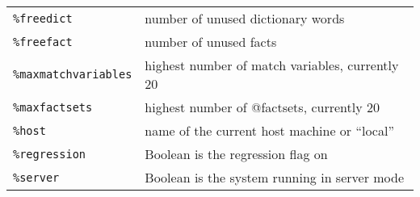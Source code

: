 \documentclass[]{article}
\begin{document}
\begin{longtable}[]{@{}ll@{}}
\begin{minipage}[t]{0.12\columnwidth}
\texttt{\%freedict}\strut
\end{minipage} & \begin{minipage}[t]{0.10\columnwidth}\raggedright\strut
number of unused dictionary words\strut
\end{minipage}\tabularnewline
\begin{minipage}[t]{0.12\columnwidth}\raggedright\strut
\texttt{\%freefact}\strut
\end{minipage} & \begin{minipage}[t]{0.10\columnwidth}\raggedright\strut
number of unused facts\strut
\end{minipage}\tabularnewline
\begin{minipage}[t]{0.12\columnwidth}\raggedright\strut
\texttt{\%maxmatchvariables}\strut
\end{minipage} & \begin{minipage}[t]{0.10\columnwidth}\raggedright\strut
highest number of match variables, currently 20\strut
\end{minipage}\tabularnewline
\begin{minipage}[t]{0.12\columnwidth}\raggedright\strut
\texttt{\%maxfactsets}\strut
\end{minipage} & \begin{minipage}[t]{0.10\columnwidth}\raggedright\strut
highest number of @factsets, currently 20\strut
\end{minipage}\tabularnewline
\begin{minipage}[t]{0.12\columnwidth}\raggedright\strut
\texttt{\%host}\strut
\end{minipage} & \begin{minipage}[t]{0.10\columnwidth}\raggedright\strut
name of the current host machine or ``local''\strut
\end{minipage}\tabularnewline
\begin{minipage}[t]{0.12\columnwidth}\raggedright\strut
\texttt{\%regression}\strut
\end{minipage} & \begin{minipage}[t]{0.10\columnwidth}\raggedright\strut
Boolean is the regression flag on\strut
\end{minipage}\tabularnewline
\begin{minipage}[t]{0.12\columnwidth}\raggedright\strut
\texttt{\%server}\strut
\end{minipage} & \begin{minipage}[t]{0.10\columnwidth}\raggedright\strut
Boolean is the system running in server mode\strut
\end{minipage}\tabularnewline

\end{longtable}
\end{document}
